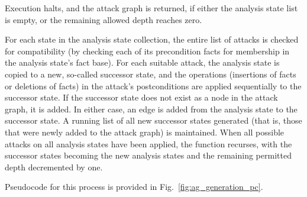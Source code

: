 Execution halts, and the attack graph is returned, if either the analysis
state list is empty, or the remaining allowed depth reaches zero.

For each state in the analysis state collection, the entire list of attacks
is checked for compatibility (by checking each of its precondition
facts for membership in the analysis state's fact base). For each suitable
attack, the analysis state is copied to a new, so-called successor state, and
the operations (insertions of facts or deletions of facts) in the attack's
postconditions are applied sequentially to the successor state. If the
successor state does not exist as a node in the attack graph, it is added. In
either case, an edge is added from the analysis state to the successor state.
A running list of all new successor states generated (that is, those that were
newly added to the attack graph) is maintained. When all possible attacks on
all analysis states have been applied, the function recurses, with the
successor states becoming the new analysis states and the remaining permitted
depth decremented by one.

Pseudocode for this process is provided in Fig.~\ref{fig:ag_generation_pc}.


